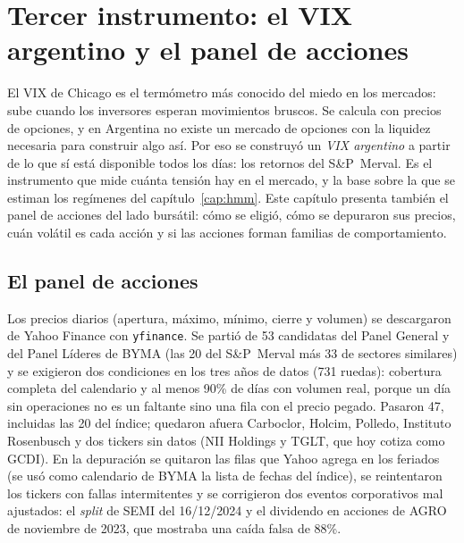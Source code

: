 \chapter{Tercer instrumento: el VIX argentino y el panel de acciones}
\label{cap:vix}

El VIX de Chicago es el termómetro más conocido del miedo en los mercados: sube cuando los
inversores esperan movimientos bruscos. Se calcula con precios de opciones, y en Argentina no
existe un mercado de opciones con la liquidez necesaria para construir algo así. Por eso se
construyó un \textit{VIX argentino} a partir de lo que sí está disponible todos los días: los
retornos del S\&P~Merval. Es el instrumento que mide cuánta tensión hay en el mercado, y la
base sobre la que se estiman los regímenes del capítulo~\ref{cap:hmm}. Este capítulo presenta
también el panel de acciones del lado bursátil: cómo se eligió, cómo se depuraron sus precios,
cuán volátil es cada acción y si las acciones forman familias de comportamiento.

\section{El panel de acciones}
\label{sec:panel}

Los precios diarios (apertura, máximo, mínimo, cierre y volumen) se descargaron de Yahoo Finance
con \texttt{yfinance}. Se partió de 53 candidatas del Panel General y del Panel Líderes de BYMA
(las 20 del S\&P~Merval más 33 de sectores similares) y se exigieron dos condiciones en los tres
años de datos (731 ruedas): cobertura completa del calendario y al menos 90\% de días con volumen
real, porque un día sin operaciones no es un faltante sino una fila con el precio pegado. Pasaron
47, incluidas las 20 del índice; quedaron afuera Carboclor, Holcim, Polledo, Instituto Rosenbusch
y dos tickers sin datos (NII Holdings y TGLT, que hoy cotiza como GCDI). En la depuración se
quitaron las filas que Yahoo agrega en los feriados (se usó como calendario de BYMA la lista de
fechas del índice), se reintentaron los tickers con fallas intermitentes y se corrigieron dos
eventos corporativos mal ajustados: el \textit{split} de SEMI del 16/12/2024 y el dividendo en
acciones de AGRO de noviembre de 2023, que mostraba una caída falsa de 88\%.

